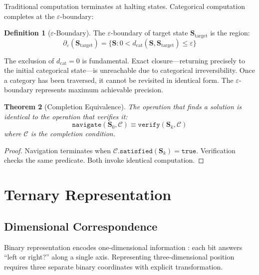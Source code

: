 \documentclass[10pt,twocolumn]{article}
\newtheorem{theorem}{Theorem}[section]
\theoremstyle{definition}
\newtheorem{definition}[theorem]{Definition}
\theoremstyle{remark}
\newcommand{\Scoord}{\mathbf{S}}
\begin{document}
Traditional computation terminates at halting states. Categorical computation completes at the $\varepsilon$-boundary:

\begin{definition}[$\varepsilon$-Boundary]
The $\varepsilon$-boundary of target state $\Scoord_{\text{target}}$ is the region:
\begin{equation}
\partial_\varepsilon(\Scoord_{\text{target}}) = \{\Scoord : 0 < d_{\text{cat}}(\Scoord, \Scoord_{\text{target}}) \leq \varepsilon\}
\end{equation}
\end{definition}

The exclusion of $d_{\text{cat}} = 0$ is fundamental. Exact closure---returning precisely to the initial categorical state---is unreachable due to categorical irreversibility. Once a category has been traversed, it cannot be revisited in identical form. The $\varepsilon$-boundary represents maximum achievable precision.

\begin{theorem}[Completion Equivalence]
The operation that finds a solution is identical to the operation that verifies it:
\begin{equation}
\texttt{navigate}(\Scoord_0, \mathcal{C}) \equiv \texttt{verify}(\Scoord_k, \mathcal{C})
\end{equation}
where $\mathcal{C}$ is the completion condition.
\end{theorem}

\begin{proof}
Navigation terminates when $\mathcal{C}.\texttt{satisfied}(\Scoord_k) = \texttt{true}$. Verification checks the same predicate. Both invoke identical computation.
\end{proof}

\section{Ternary Representation}
\label{sec:ternary}

\subsection{Dimensional Correspondence}

Binary representation encodes one-dimensional information \cite{shannon1948}: each bit answers ``left or right?'' along a single axis. Representing three-dimensional position requires three separate binary coordinates with explicit transformation.
\end{document}
